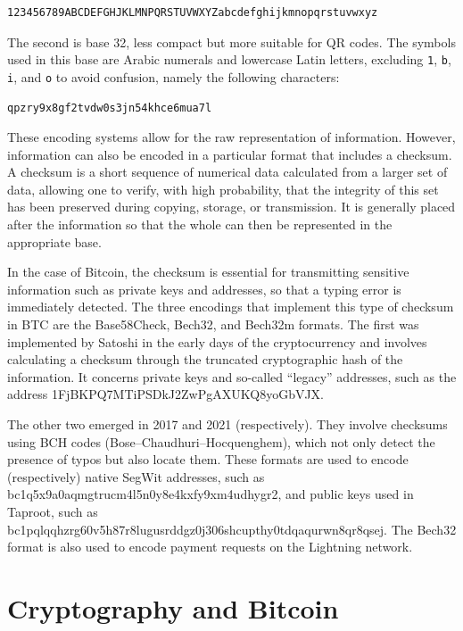 \documentclass[
  a5paper,
  smalldemyvopaper,10pt,twoside,onecolumn,openright,extrafontsizes,hidelinks]{memoir}
\begin{document}
\begin{verbatim}
123456789ABCDEFGHJKLMNPQRSTUVWXYZabcdefghijkmnopqrstuvwxyz
\end{verbatim}

The second is base 32, less compact but more suitable for QR codes. The
symbols used in this base are Arabic numerals and lowercase Latin
letters, excluding \texttt{1}, \texttt{b}, \texttt{i}, and \texttt{o} to
avoid confusion, namely the following characters:

\begin{verbatim}
qpzry9x8gf2tvdw0s3jn54khce6mua7l
\end{verbatim}

These encoding systems allow for the raw representation of information.
However, information can also be encoded in a particular format that
includes a checksum. A checksum is a short sequence of numerical data
calculated from a larger set of data, allowing one to verify, with high
probability, that the integrity of this set has been preserved during
copying, storage, or transmission. It is generally placed after the
information so that the whole can then be represented in the appropriate
base.

In the case of Bitcoin, the checksum is essential for transmitting
sensitive information such as private keys and addresses, so that a
typing error is immediately detected. The three encodings that implement
this type of checksum in BTC are the Base58Check, Bech32, and Bech32m
formats. The first was implemented by Satoshi in the early days of the
cryptocurrency and involves calculating a checksum through the truncated
cryptographic hash of the information. It concerns private keys and
so-called ``legacy'' addresses, such as the address
1FjBKPQ7MTiPSDkJ2ZwPgAXUKQ8yoGbVJX.

The other two emerged in 2017 and 2021 (respectively). They involve
checksums using BCH codes (Bose--Chaudhuri--Hocquenghem), which not only
detect the presence of typos but also locate them. These formats are
used to encode (respectively) native SegWit addresses, such as
bc1q5x9a0aqmgtrucm4l5n0y8e4kxfy9xm4udhygr2, and public keys used in
Taproot, such as
bc1pqlqqhzrg60v5h87r8lugusrddgz0j306shcupthy0tdqaqurwn8qr8qsej. The
Bech32 format is also used to encode payment requests on the Lightning
network.

\section*{Cryptography and Bitcoin}\label{cryptography-and-bitcoin}
\end{document}
